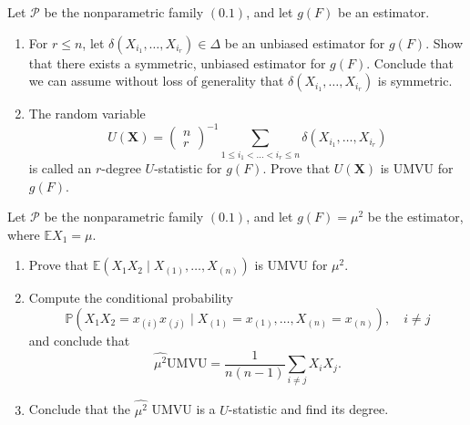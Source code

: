 \begin{exercise}
    Let \(\mathcal{P}\) be the nonparametric family \((0.1)\), and let \(g(F)\) be an estimator. 
    \begin{enumerate}
        \item For \(r \leq n\), let \(\delta\left(X_{i_{1}}, \ldots, X_{i_{r}}\right) \in \Delta\) be an unbiased estimator for \(g(F)\). Show that there exists a symmetric, unbiased estimator for \(g(F)\). Conclude that we can assume without loss of generality that \(\delta\left(X_{i_{1}}, \ldots, X_{i_{r}}\right)\) is symmetric. 
        \item The random variable
        \[
        U(\mathbf{X})=\left(\begin{array}{l}
        n \\
        r
        \end{array}\right)^{-1} \sum_{1 \leq i_{1}<\ldots<i_{r} \leq n} \delta\left(X_{i_{1}}, \ldots, X_{i_{r}}\right)
        \]
        is called an \(r\)-degree \(U\)-statistic for \(g(F)\). Prove that \(U(\mathbf{X})\) is UMVU for \(g(F)\). 
    \end{enumerate}
\end{exercise}


\begin{exercise}
    Let \(\mathcal{P}\) be the nonparametric family \((0.1)\), and let \(g(F)=\mu^{2}\) be the estimator, where \(\mathbb{E} X_{1}=\mu\). 
    \begin{enumerate}
        \item Prove that \(\mathbb{E}\left(X_{1} X_{2} \mid X_{(1)}, \ldots, X_{(n)}\right)\) is UMVU for \(\mu^{2}\). 
        \item Compute the conditional probability
        \[
        \mathbb{P}\left(X_{1} X_{2}=x_{(i)} x_{(j)} \mid X_{(1)}=x_{(1)}, \ldots, X_{(n)}=x_{(n)}\right), \quad i \neq j
        \]
        and conclude that
        \[
        \widehat{\mu^{2}} \mathrm{UMVU}=\frac{1}{n(n-1)} \sum_{i \neq j} X_{i} X_{j}. 
        \]
        \item Conclude that the \(\widehat{\mu^{2}}\) UMVU is a \(U\)-statistic and find its degree. 
    \end{enumerate}
\end{exercise}


